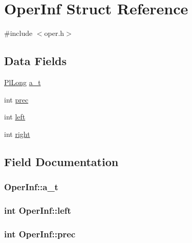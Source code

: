 \hypertarget{structOperInf}{}\section{Oper\+Inf Struct Reference}
\label{structOperInf}


{\ttfamily \#include $<$oper.\+h$>$}

\subsection*{Data Fields}
\begin{DoxyCompactItemize}
\item 
\hyperlink{gprolog_8h_a4d005b136d7fb28537eb1815f7868b63}{Pl\+Long} \hyperlink{structOperInf_a5ab08736fa238d100509038e938fe187}{a\+\_\+t}
\item 
int \hyperlink{structOperInf_a50a4ec676df2b3555058f59753d48698}{prec}
\item 
int \hyperlink{structOperInf_afbf02377f941f53f5cd63f151c2da1f0}{left}
\item 
int \hyperlink{structOperInf_a558dc457885d6b96f6d8f833f1ce6c66}{right}
\end{DoxyCompactItemize}


\subsection{Field Documentation}
\subsubsection[{\texorpdfstring{a\+\_\+t}{a_t}}]{ Oper\+Inf\+::a\+\_\+t}\hypertarget{structOperInf_a5ab08736fa238d100509038e938fe187}{}\label{structOperInf_a5ab08736fa238d100509038e938fe187}
\subsubsection[{\texorpdfstring{left}{left}}]{\setlength{\rightskip}{0pt plus 5cm}int Oper\+Inf\+::left}\hypertarget{structOperInf_afbf02377f941f53f5cd63f151c2da1f0}{}\label{structOperInf_afbf02377f941f53f5cd63f151c2da1f0}
\subsubsection[{\texorpdfstring{prec}{prec}}]{\setlength{\rightskip}{0pt plus 5cm}int Oper\+Inf\+::prec}\hypertarget{structOperInf_a50a4ec676df2b3555058f59753d48698}{}\label{structOperInf_a50a4ec676df2b3555058f59753d48698}
